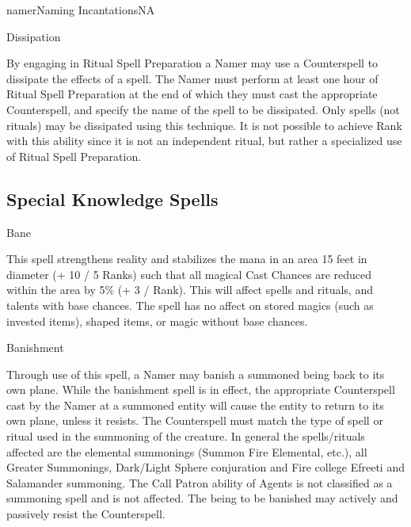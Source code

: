 \begin{college}[2.0]{namer}{Naming Incantations}{NA}
\begin{ritual}[Q-1]{Dissipation}

\begin{effects}
By engaging in Ritual Spell Preparation a Namer may use a Counterspell
to dissipate the effects of a spell.  The Namer must perform at least
one hour of Ritual Spell Preparation at the end of which they must
cast the appropriate Counterspell, and specify the name of the spell
to be dissipated. Only spells (not rituals) may be dissipated using
this technique. It is not possible to achieve Rank with this ability
since it is not an independent ritual, but rather a specialized use of
Ritual Spell Preparation.
\end{effects}
\end{ritual}

\subsection{Special Knowledge Spells}

\begin{spell}[S-1]{Bane}
\begin{effects}
This spell strengthens reality and stabilizes the mana in an area 15
feet in diameter (+ 10 / 5 Ranks) such that all magical Cast Chances
are reduced within the area by 5\% (+ 3 / Rank).  This will affect
spells and rituals, and talents with base chances. The spell has no
affect on stored magics (such as invested items), shaped items, or
magic without base chances.
\end{effects}
\end{spell}

\begin{spell}[S-2]{Banishment}

\begin{effects}
Through use of this spell, a Namer may banish a summoned being back to
its own plane. While the banishment spell is in effect, the
appropriate Counterspell cast by the Namer at a summoned entity will
cause the entity to return to its own plane, unless it resists. The
Counterspell must match the type of spell or ritual used in the
summoning of the creature. In general the spells/rituals affected are
the elemental summonings (Summon Fire Elemental, etc.), all Greater
Summonings, Dark/Light Sphere conjuration and Fire college Efreeti and
Salamander summoning. The Call Patron ability of Agents is not
classified as a summoning spell and is not affected.  The being to be
banished may actively and passively resist the Counterspell.
\end{effects}
\end{spell}


\end{college}
